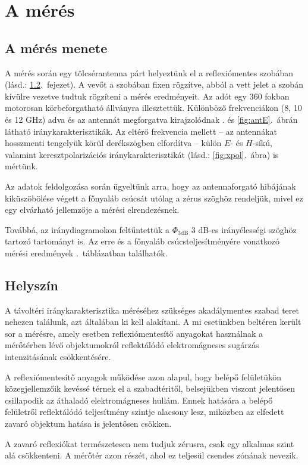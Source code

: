 \documentclass{article}
\newcommand{\hpbw}{\Phi_\mathrm{3dB}}
\begin{document}
\section{A mérés}
\subsection{A mérés menete}
A mérés során egy tölcsérantenna párt helyeztünk el a reflexiómentes szobában (lásd.: \ref{sec:norefl}.~fejezet). A vevőt a szobában fixen rögzítve, abból a vett jelet a szobán kívülre vezetve tudtuk rögzíteni a mérés eredményeit. Az adót egy 360 fokban motorosan körbeforgatható állványra illesztettük. Különböző frekvenciákon (8, 10 és 12 GHz) adva és az antennát megforgatva kirajzolódnak . és \ref{fig:antE}.~ábrán látható iránykarakterisztikák. Az eltérő frekvencia mellett -- az antennákat hosszmenti tengelyük körül derékszögben elfordítva -- külön $E$- és $H$-síkú, valamint keresztpolarizációs iránykarakterisztikát (lásd.: \ref{fig:xpol}.~ábra) is mértünk.

Az adatok feldolgozása során ügyeltünk arra, hogy az antennaforgató hibájának kiküszöbölése végett a főnyaláb csúcsát utólag a zérus szöghöz rendeljük, mivel ez egy elvárható jellemzője a mérési elrendezésnek.

Továbbá, az iránydiagramokon feltűntettük a $\hpbw$ 3 dB-es irányélességi szöghöz tartozó tartományt is. Az erre és a főnyaláb csúcsteljesítményére vonatkozó mérési eredmények .~táblázatban találhatók.
\subsection{Helyszín}
\label{sec:norefl}
A távoltéri iránykarakterisztika méréséhez szükséges akadálymentes szabad teret nehezen
találunk, azt általában ki kell alakítani. A mi esetünkben beltéren került sor a mérésre, amely esetben reflexiómentesítő anyagokat használnak a mérőtérben lévő objektumokról reflektálódó elektromágneses sugárzás
intenzitásának csökkentésére.

A reflexiómentesítő anyagok működése azon alapul, hogy belépő felületükön közegjellemzőik kevéssé térnek el a szabadtéritől, belsejükben viszont jelentősen csillapodik az áthaladó elektromágneses hullám. Ennek hatására a belépő felületről reflektálódó teljesítmény szintje alacsony lesz, miközben az elfedett zavaró objektum hatása is jelentősen csökken.

A zavaró reflexiókat természetesen nem tudjuk zérusra, csak egy alkalmas szint alá csökkenteni. A mérőtér azon részét, ahol ez teljesül csendes zónának nevezik.
\end{document}
